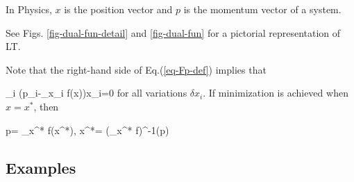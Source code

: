 In Physics, $x$ is the position
vector and $p$ is the momentum
vector of a system.

See Figs.
\ref{fig-dual-fun-detail}
and \ref{fig-dual-fun}
for a pictorial
representation
of LT.

Note that
the right-hand side of
Eq.(\ref{eq-Fp-def})
implies that

\beq
\sum_i
(p_i-\partial_{x_i}
f(x))\delta x_i=0
\eeq
for all variations $\delta x_i$.
If minimization is achieved
when $x=x^*$, then

\beq
p= \nabla_{x^*} f(x^*),
\quad x^*=
(\nabla_{x^*} f)^{-1}(p)
\eeq

\subsection{Examples}

